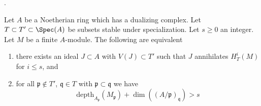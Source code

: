 \begin{proposition}
\label{proposition-annihilator}
\begin{reference}
\cite{Faltings-annulators}.
\end{reference}
Let $A$ be a Noetherian ring which has a dualizing complex.
Let $T \subset T' \subset \Spec(A)$ be subsets stable under
specialization. Let $s \geq 0$ an integer. Let $M$ be a finite $A$-module.
The following are equivalent
\begin{enumerate}
\item there exists an ideal $J \subset A$ with $V(J) \subset T'$
such that $J$ annihilates $H^i_T(M)$ for $i \leq s$, and
\item for all $\mathfrak p \not \in T'$,
$\mathfrak q \in T$ with $\mathfrak p \subset \mathfrak q$
we have
$$
\text{depth}_{A_\mathfrak p}(M_\mathfrak p) +
\dim((A/\mathfrak p)_\mathfrak q) > s
$$
\end{enumerate}
\end{proposition}

